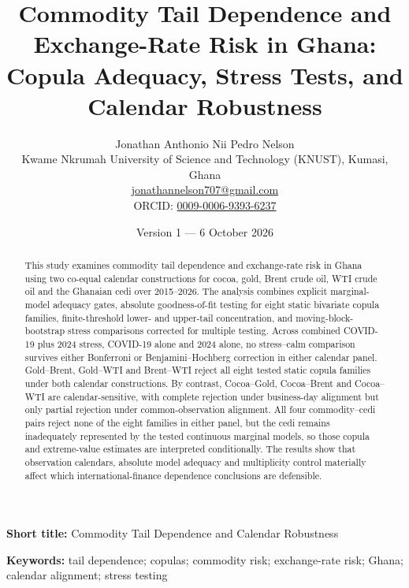 \documentclass[12pt,a4paper]{article}
\title{Commodity Tail Dependence and Exchange-Rate Risk in Ghana:\\Copula Adequacy, Stress Tests, and Calendar Robustness}
\author{Jonathan Anthonio Nii Pedro Nelson\\Kwame Nkrumah University of Science and Technology (KNUST), Kumasi, Ghana\\\href{mailto:jonathannelson707@gmail.com}{jonathannelson707@gmail.com}\\ORCID: \href{https://orcid.org/0009-0006-9393-6237}{0009-0006-9393-6237}}
\date{Version 1 --- 6 October 2026}
\begin{document}
\maketitle

\begin{center}
\end{center}

\noindent\textbf{Short title:} Commodity Tail Dependence and Calendar Robustness

\begin{abstract}
This study examines commodity tail dependence and exchange-rate risk in Ghana using two co-equal calendar constructions for cocoa, gold, Brent crude oil, WTI crude oil and the Ghanaian cedi over 2015--2026. The analysis combines explicit marginal-model adequacy gates, absolute goodness-of-fit testing for eight static bivariate copula families, finite-threshold lower- and upper-tail concentration, and moving-block-bootstrap stress comparisons corrected for multiple testing. Across combined COVID-19 plus 2024 stress, COVID-19 alone and 2024 alone, no stress--calm comparison survives either Bonferroni or Benjamini--Hochberg correction in either calendar panel. Gold--Brent, Gold--WTI and Brent--WTI reject all eight tested static copula families under both calendar constructions. By contrast, Cocoa--Gold, Cocoa--Brent and Cocoa--WTI are calendar-sensitive, with complete rejection under business-day alignment but only partial rejection under common-observation alignment. All four commodity--cedi pairs reject none of the eight families in either panel, but the cedi remains inadequately represented by the tested continuous marginal models, so those copula and extreme-value estimates are interpreted conditionally. The results show that observation calendars, absolute model adequacy and multiplicity control materially affect which international-finance dependence conclusions are defensible.
\end{abstract}

\noindent\textbf{Keywords:} tail dependence; copulas; commodity risk; exchange-rate risk; Ghana; calendar alignment; stress testing






\end{document}
